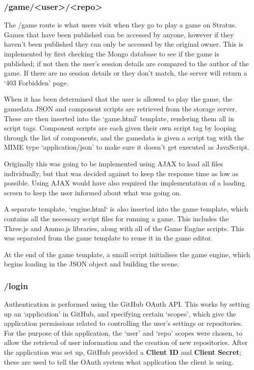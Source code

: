 	\subsubsection{/game/<user>/<repo>}
	The /game route is what users visit when they go to play a game on Stratus. Games that have been published can be accessed by anyone, however if they haven't been published they can only be accessed by the original owner. This is implemented by first checking the Mongo database to see if the game is published; if not then the user's session details are compared to the author of the game. If there are no session details or they don't match, the server will return a `403 Forbidden' page.

	When it has been determined that the user is allowed to play the game, the gamedata JSON and component scripts are retrieved from the storage server. These are then inserted into the `game.html' template, rendering them all in script tags. Component scripts are each given their own script tag by looping through the list of components, and the gamedata is given a script tag with the MIME type `application/json' to make sure it doesn't get executed as JavaScript.

	Originally this was going to be implemented using AJAX to load all files individually, but that was decided against to keep the response time as low as possible. Using AJAX would have also required the implementation of a loading screen to keep the user informed about what was going on.

	A separate template, `engine.html` is also inserted into the game template, which contains all the necessary script files for running a game. This includes the Three.js and Ammo.js libraries, along with all of the Game Engine scripts. This was separated from the game template to reuse it in the game editor.

	At the end of the game template, a small script initialises the game engine, which begins loading in the JSON object and building the scene.

	\subsubsection{/login}
	Authentication is performed using the GitHub OAuth API. This works by setting up an `application' in GitHub, and specifying certain `scopes', which give the application permissions related to controlling the user's settings or repositories. For the purpose of this application, the `user' and `repo' scopes were chosen, to allow the retrieval of user information and the creation of new repositories. After the application was set up, GitHub provided a \textbf{Client ID} and \textbf{Client Secret}; these are used to tell the OAuth system what application the client is using.

